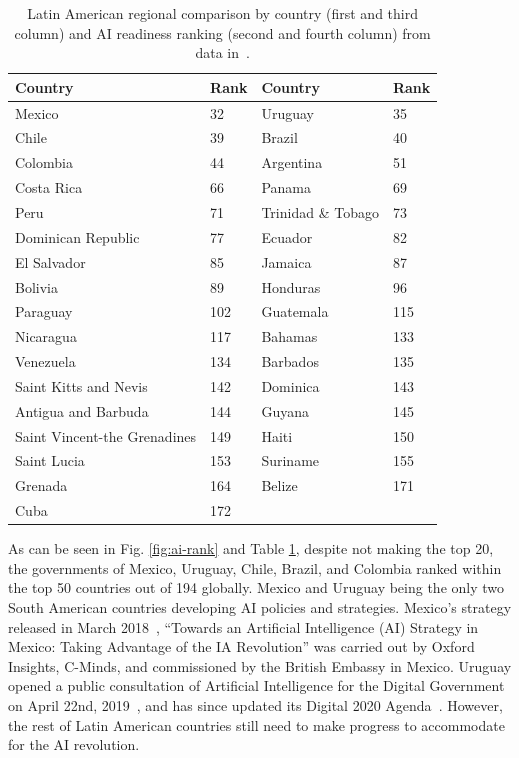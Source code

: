 \documentclass[conference]{IEEEtran}
\begin{document}
\begin{table}[!t]
\caption{Latin American regional comparison by country (first and third column) and AI readiness ranking (second and fourth column) from data in~\cite{miller2019government}.}
\label{tbl:ai-rank}
\centering
\begin{tabular}{|l|l||l|l|}
\hline
\textbf{Country} & \textbf{Rank} & \textbf{Country} & \textbf{Rank} \\
\hline
Mexico & 32 & Uruguay & 35 \\
Chile & 39 & Brazil & 40 \\
Colombia & 44 & Argentina & 51 \\
Costa Rica & 66 & Panama & 69 \\ 
Peru & 71 & Trinidad \& Tobago & 73 \\
Dominican Republic & 77 & Ecuador & 82 \\
El Salvador & 85 & Jamaica & 87 \\     
Bolivia & 89 & Honduras & 96 \\  
Paraguay & 102 & Guatemala & 115 \\    
Nicaragua & 117 & Bahamas & 133 \\     
Venezuela & 134 & Barbados & 135 \\    
Saint Kitts and Nevis & 142 & Dominica & 143 \\
Antigua and Barbuda & 144 & Guyana & 145 \\    
Saint Vincent-the Grenadines & 149 & Haiti & 150 \\
Saint Lucia & 153 & Suriname & 155 \\
Grenada & 164 & Belize & 171 \\
Cuba & 172 & & \\
\hline
\end{tabular}
\end{table}

As can be seen in Fig. \ref{fig:ai-rank} and Table \ref{tbl:ai-rank}, despite not making the top 20, the governments of Mexico, Uruguay, Chile, Brazil, and Colombia ranked within the top 50 countries out of 194 globally. Mexico and Uruguay being the only two South American countries developing AI policies and strategies. Mexico's strategy released in March 2018~\cite{martinho2018mexico}, ``Towards an Artificial Intelligence (AI) Strategy in Mexico: Taking Advantage of the IA Revolution'' was carried out by Oxford Insights, C-Minds, and commissioned by the British Embassy in Mexico. Uruguay opened a public consultation of Artificial Intelligence for the Digital Government on April 22nd, 2019~\cite{uruguay2019inteligencia}, and has since updated its Digital 2020 Agenda~\cite{uruguay2019agenda}. However, the rest of Latin American countries still need to make progress to accommodate for the AI revolution.
\end{document}
